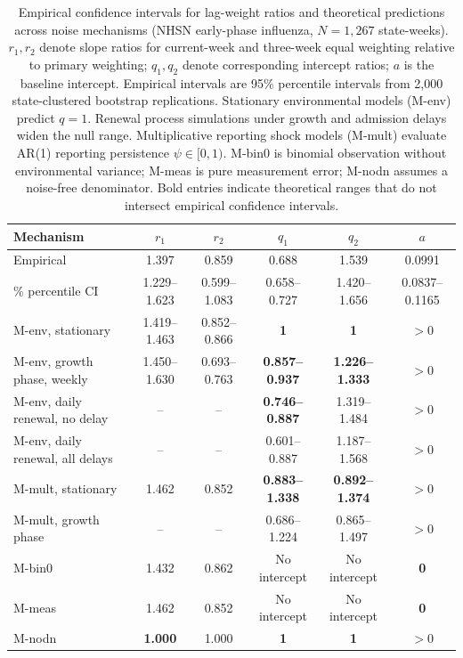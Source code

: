 \begin{table}[!tbp]
  \centering
  \caption{Empirical confidence intervals for lag-weight ratios and theoretical predictions across noise mechanisms (NHSN early-phase influenza, $N = 1{,}267$ state-weeks). $r_1, r_2$ denote slope ratios for current-week and three-week equal weighting relative to primary weighting; $q_1, q_2$ denote corresponding intercept ratios; $a$ is the baseline intercept. Empirical intervals are 95\% percentile intervals from 2,000 state-clustered bootstrap replications. Stationary environmental models (M-env) predict $q = 1$. Renewal process simulations under growth and admission delays widen the null range. Multiplicative reporting shock models (M-mult) evaluate AR(1) reporting persistence $\psi \in [0, 1)$. M-bin0 is binomial observation without environmental variance; M-meas is pure measurement error; M-nodn assumes a noise-free denominator. Bold entries indicate theoretical ranges that do not intersect empirical confidence intervals.}
  \label{tab:ratios}
  \footnotesize
  \setlength{\tabcolsep}{4pt}
  \begin{tabular}{@{}lccccc@{}}
    \toprule
    Mechanism & $r_1$ & $r_2$ & $q_1$ & $q_2$ & $a$ \\
    \midrule
    Empirical & 1.397 & 0.859 & 0.688 & 1.539 & 0.0991 \\
    \quad 95\% percentile CI & 1.229--1.623 & 0.599--1.083 & 0.658--0.727 & 1.420--1.656 & 0.0837--0.1165 \\
    \midrule
    M-env, stationary & 1.419--1.463 & 0.852--0.866 & \textbf{1} & \textbf{1} & $>0$ \\
    M-env, growth phase, weekly & 1.450--1.630 & 0.693--0.763 & \textbf{0.857--0.937} & \textbf{1.226--1.333} & $>0$ \\
    M-env, daily renewal, no delay & -- & -- & \textbf{0.746--0.887} & 1.319--1.484 & $>0$ \\
    M-env, daily renewal, all delays & -- & -- & 0.601--0.887 & 1.187--1.568 & $>0$ \\
    M-mult, stationary & 1.462 & 0.852 & \textbf{0.883--1.338} & \textbf{0.892--1.374} & $>0$ \\
    M-mult, growth phase & -- & -- & 0.686--1.224 & 0.865--1.497 & $>0$ \\
    M-bin0 & 1.432 & 0.862 & No intercept & No intercept & \textbf{0} \\
    M-meas & 1.462 & 0.852 & No intercept & No intercept & \textbf{0} \\
    M-nodn & \textbf{1.000} & 1.000 & \textbf{1} & \textbf{1} & $>0$ \\
    \bottomrule
  \end{tabular}
\end{table}
